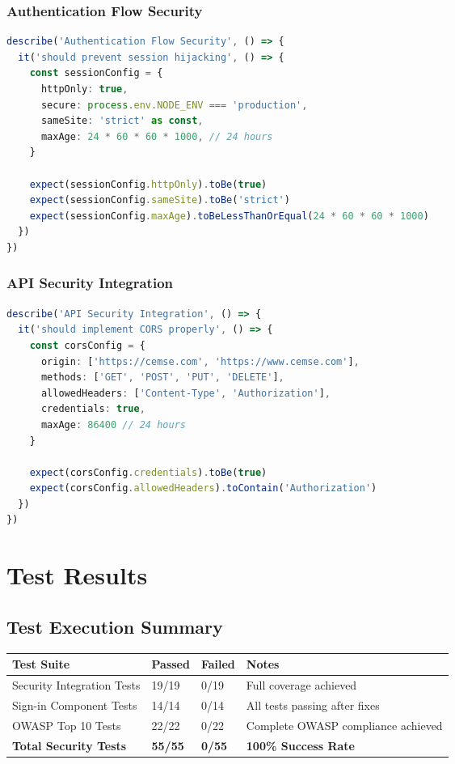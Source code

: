 \documentclass[12pt]{article}
\begin{document}
\subsubsection{Authentication Flow Security}
\begin{lstlisting}[language=typescript, caption=Session Security Test]
describe('Authentication Flow Security', () => {
  it('should prevent session hijacking', () => {
    const sessionConfig = {
      httpOnly: true,
      secure: process.env.NODE_ENV === 'production',
      sameSite: 'strict' as const,
      maxAge: 24 * 60 * 60 * 1000, // 24 hours
    }

    expect(sessionConfig.httpOnly).toBe(true)
    expect(sessionConfig.sameSite).toBe('strict')
    expect(sessionConfig.maxAge).toBeLessThanOrEqual(24 * 60 * 60 * 1000)
  })
})
\end{lstlisting}

\subsubsection{API Security Integration}
\begin{lstlisting}[language=typescript, caption=CORS Security Test]
describe('API Security Integration', () => {
  it('should implement CORS properly', () => {
    const corsConfig = {
      origin: ['https://cemse.com', 'https://www.cemse.com'],
      methods: ['GET', 'POST', 'PUT', 'DELETE'],
      allowedHeaders: ['Content-Type', 'Authorization'],
      credentials: true,
      maxAge: 86400 // 24 hours
    }

    expect(corsConfig.credentials).toBe(true)
    expect(corsConfig.allowedHeaders).toContain('Authorization')
  })
})
\end{lstlisting}

\section{Test Results}

\subsection{Test Execution Summary}

\begin{longtable}{|p{4cm}|p{2cm}|p{2cm}|p{5cm}|}
\hline
\textbf{Test Suite} & \textbf{Passed} & \textbf{Failed} & \textbf{Notes} \\
\hline
Security Integration Tests & 19/19 & 0/19 & Full coverage achieved \\
\hline
Sign-in Component Tests & 14/14 & 0/14 & All tests passing after fixes \\
\hline
OWASP Top 10 Tests & 22/22 & 0/22 & Complete OWASP compliance achieved \\
\hline
\textbf{Total Security Tests} & \textbf{55/55} & \textbf{0/55} & \textbf{100\% Success Rate} \\
\hline
\end{longtable}
\end{document}
